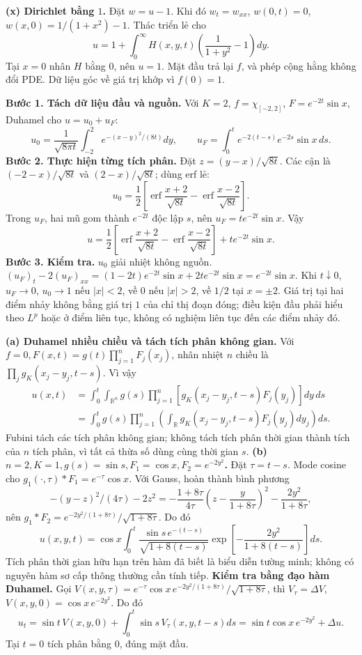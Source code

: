 \textbf{(x) Dirichlet bằng $1$.}
Đặt $w=u-1$. Khi đó $w_t=w_{xx}$, $w(0,t)=0$, $w(x,0)=1/(1+x^2)-1$. Thác triển lẻ cho
\[u=1+\int_0^\infty H(x,y,t)\left(\frac1{1+y^2}-1\right)dy.\]
Tại $x=0$ nhân $H$ bằng $0$, nên $u=1$. Mặt đầu trả lại $f$, và phép cộng hằng không đổi PDE. Dữ liệu góc về giá trị khớp vì $f(0)=1$.

\textbf{Bước 1. Tách dữ liệu đầu và nguồn.}
Với $K=2$, $f=\chi_{[-2,2]}$, $F=e^{-2t}\sin x$, Duhamel cho $u=u_0+u_F$:
\[u_0=\frac1{\sqrt{8\pi t}}\int_{-2}^2e^{-(x-y)^2/(8t)}dy,\qquad
u_F=\int_0^te^{-2(t-s)}e^{-2s}\sin x\,ds.\]
\textbf{Bước 2. Thực hiện từng tích phân.}
Đặt $z=(y-x)/\sqrt{8t}$. Các cận là $(-2-x)/\sqrt{8t}$ và $(2-x)/\sqrt{8t}$; dùng erf lẻ:
\[u_0=\frac12\left[\operatorname{erf}\frac{x+2}{\sqrt{8t}}
-\operatorname{erf}\frac{x-2}{\sqrt{8t}}\right].\]
Trong $u_F$, hai mũ gom thành $e^{-2t}$ độc lập $s$, nên $u_F=te^{-2t}\sin x$. Vậy
\[u=\frac12\left[\operatorname{erf}\frac{x+2}{\sqrt{8t}}
-\operatorname{erf}\frac{x-2}{\sqrt{8t}}\right]+te^{-2t}\sin x.\]
\textbf{Bước 3. Kiểm tra.}
$u_0$ giải nhiệt không nguồn. $(u_F)_t-2(u_F)_{xx}=(1-2t)e^{-2t}\sin x+2te^{-2t}\sin x=e^{-2t}\sin x$. Khi $t\downarrow0$, $u_F\to0$, $u_0\to1$ nếu $|x|<2$, về $0$ nếu $|x|>2$, về $1/2$ tại $x=\pm2$. Giá trị tại hai điểm nhảy không bằng giá trị $1$ của chỉ thị đoạn đóng; điều kiện đầu phải hiểu theo $L^p$ hoặc ở điểm liên tục, không có nghiệm liên tục đến các điểm nhảy đó.

\textbf{(a) Duhamel nhiều chiều và tách tích phân không gian.}
Với $f=0,F(x,t)=g(t)\prod_{j=1}^nF_j(x_j)$, nhân nhiệt $n$ chiều là $\prod_jg_K(x_j-y_j,t-s)$. Vì vậy
\begin{align*}
u(x,t)&=\int_0^t\!\int_{\mathbb R^n}
g(s)\prod_{j=1}^n[g_K(x_j-y_j,t-s)F_j(y_j)]dy\,ds\\
&=\int_0^tg(s)\prod_{j=1}^n
\left(\int_{\mathbb R}g_K(x_j-y_j,t-s)F_j(y_j)dy_j\right)ds.
\end{align*}
Fubini tách các tích phân không gian; không tách tích phân thời gian thành tích của $n$ tích phân, vì tất cả thừa số dùng cùng thời gian $s$.
\textbf{(b) $n=2,K=1,g(s)=\sin s,F_1=\cos x,F_2=e^{-2y^2}$.}
Đặt $\tau=t-s$. Mode cosine cho $g_1(\cdot,\tau)*F_1=e^{-\tau}\cos x$. Với Gauss, hoàn thành bình phương
\[-(y-z)^2/(4\tau)-2z^2
=-\frac{1+8\tau}{4\tau}\left(z-\frac y{1+8\tau}\right)^2
-\frac{2y^2}{1+8\tau},\]
nên $g_1*F_2=e^{-2y^2/(1+8\tau)}/\sqrt{1+8\tau}$. Do đó
\[u(x,y,t)=\cos x\int_0^t
\frac{\sin s\,e^{-(t-s)}}{\sqrt{1+8(t-s)}}
\exp\left[-\frac{2y^2}{1+8(t-s)}\right]ds.\]
Tích phân thời gian hữu hạn trên hàm đã biết là biểu diễn tường minh; không có nguyên hàm sơ cấp thông thường cần tính tiếp.
\textbf{Kiểm tra bằng đạo hàm Duhamel.}
Gọi $V(x,y,\tau)=e^{-\tau}\cos x\,e^{-2y^2/(1+8\tau)}/\sqrt{1+8\tau}$, thì $V_\tau=\Delta V$, $V(x,y,0)=\cos x\,e^{-2y^2}$. Do đó
\[u_t=\sin t\,V(x,y,0)+\int_0^t\sin s\,V_\tau(x,y,t-s)ds
=\sin t\cos x\,e^{-2y^2}+\Delta u.\]
Tại $t=0$ tích phân bằng $0$, đúng mặt đầu.

